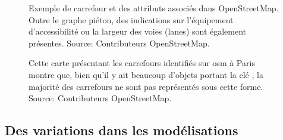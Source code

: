 \begin{figure}[ht]
    \centering
    \caption[Anatomie d'un carrefour dans OpenStreetMap]{Exemple de carrefour et des attributs associés dans OpenStreetMap. Outre le graphe piéton, des indications sur l'équipement d'accessibilité ou la largeur des voies (lanes) sont également présentes. Source: Contributeurs OpenStreetMap.}
    \label{fig:modelisation_anatomie_carrefour_osm}
\end{figure}

\begin{figure}[ht]
    \centering
    \caption[Les carrefours dans OpenStreetMap à Paris]{Cette carte présentant les carrefours identifiés sur \gls{osm} à Paris montre que, bien qu'il y ait beaucoup d'objets portant la clé , la majorité des carrefours ne sont pas représentés sous cette forme. Source: Contributeurs OpenStreetMap.}
    \label{fig:modelisation_carrefours_osm_paris}
\end{figure}

\subsection{Des variations dans les modélisations}

